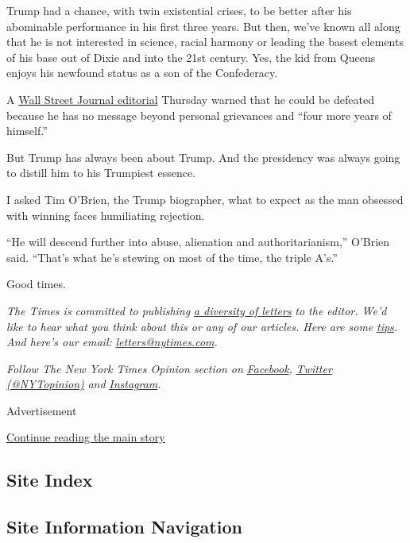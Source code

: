 Trump had a chance, with twin existential crises, to be better after his
abominable performance in his first three years. But then, we've known
all along that he is not interested in science, racial harmony or
leading the basest elements of his base out of Dixie and into the 21st
century. Yes, the kid from Queens enjoys his newfound status as a son of
the Confederacy.

A
\href{https://www.wsj.com/articles/the-trump-referendum-11593127700?mod=opinion_lead_pos10}{Wall
Street Journal editorial} Thursday warned that he could be defeated
because he has no message beyond personal grievances and ``four more
years of himself.''

But Trump has always been about Trump. And the presidency was always
going to distill him to his Trumpiest essence.

I asked Tim O'Brien, the Trump biographer, what to expect as the man
obsessed with winning faces humiliating rejection.

``He will descend further into abuse, alienation and authoritarianism,''
O'Brien said. ``That's what he's stewing on most of the time, the triple
A's.''

Good times.

\emph{The Times is committed to publishing}
\href{https://www.nytimes.com/2019/01/31/opinion/letters/letters-to-editor-new-york-times-women.html}{\emph{a
diversity of letters}} \emph{to the editor. We'd like to hear what you
think about this or any of our articles. Here are some}
\href{https://help.nytimes.com/hc/en-us/articles/115014925288-How-to-submit-a-letter-to-the-editor}{\emph{tips}}\emph{.
And here's our email:}
\href{mailto:letters@nytimes.com}{\emph{letters@nytimes.com}}\emph{.}

\emph{Follow The New York Times Opinion section on}
\href{https://www.facebook.com/nytopinion}{\emph{Facebook}}\emph{,}
\href{http://twitter.com/NYTOpinion}{\emph{Twitter (@NYTopinion)}}
\emph{and}
\href{https://www.instagram.com/nytopinion/}{\emph{Instagram}}\emph{.}

Advertisement

\protect\hyperlink{after-bottom}{Continue reading the main story}

\hypertarget{site-index}{%
\subsection{Site Index}\label{site-index}}

\hypertarget{site-information-navigation}{%
\subsection{Site Information
Navigation}\label{site-information-navigation}}

